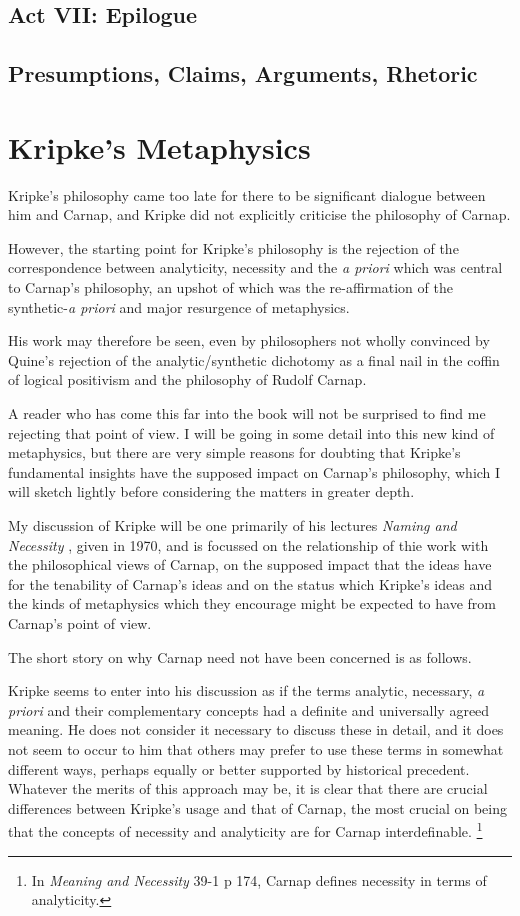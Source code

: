 \section{Act VII: Epilogue}

\section{Presumptions, Claims, Arguments, Rhetoric}

\chapter{Kripke's Metaphysics}

Kripke's philosophy came too late for there to be significant dialogue
between him and Carnap, and Kripke did not explicitly criticise the
philosophy of Carnap.

However, the starting point for Kripke's philosophy is the rejection of
the correspondence between analyticity, necessity and the \emph{a priori}
which was central to Carnap's philosophy, an upshot of which was the
re-affirmation of the synthetic-\emph{a priori} and major resurgence of
metaphysics.

His work may therefore be seen, even by philosophers not wholly convinced
by Quine's rejection of the analytic/synthetic dichotomy as a final nail
in the coffin of logical positivism and the philosophy of Rudolf Carnap.

A reader who has come this far into the book will not be surprised to find
me rejecting that point of view.
I will be going in some detail into this new kind of metaphysics, but there
are very simple reasons for doubting that Kripke's fundamental insights have
the supposed impact on Carnap's philosophy, which I will sketch lightly
before considering the matters in greater depth.

My discussion of Kripke will be one primarily of his lectures
\emph{Naming and Necessity} \cite{Kripke72}, given in 1970, and is focussed
on the relationship of thie work with the philosophical views of Carnap, on
the supposed impact that the ideas have for the tenability of Carnap's ideas
and on the status which Kripke's ideas and the kinds of metaphysics which
they encourage might be expected to have from Carnap's point of view.

The short story on why Carnap need not have been concerned is as follows.

Kripke seems to enter into his discussion as if the terms analytic, necessary,
 \emph{a priori} and their complementary concepts had a definite and universally
agreed meaning.
He does not consider it necessary to discuss these in detail, and it does not
seem to occur to him that others may prefer to use these terms in somewhat
different ways, perhaps equally or better supported by historical precedent.
Whatever the merits of this approach may be, it is clear that there are
crucial differences between Kripke's usage and that of Carnap, the most
crucial on being that the concepts of necessity and analyticity are for
Carnap interdefinable.
\footnote{In \emph{Meaning and Necessity} \cite{carnap47} 39-1 p 174, Carnap defines necessity in terms
of analyticity.}

